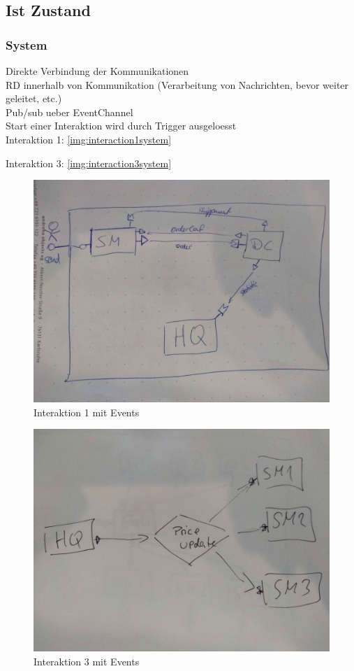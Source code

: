 \subsection{Ist Zustand}
\subsubsection{System}
Direkte Verbindung der Kommunikationen \\
RD innerhalb von Kommunikation (Verarbeitung von Nachrichten, bevor weiter geleitet, etc.)\\
Pub/sub ueber EventChannel \\
Start einer Interaktion wird durch Trigger ausgeloesst \\
Interaktion 1: \autoref{img:interaction1system}

Interaktion 3: \autoref{img:interaction3system}

\begin{figure}
\center
  \includegraphics[width=1\textwidth]{images/evaluation/specjms/interaction1system_events.png}
  \caption{Interaktion 1 mit Events}
  \label{img:interaction1system}
\end{figure}

\begin{figure}
\center
  \includegraphics[width=1\textwidth]{images/evaluation/specjms/interaction3system_events.png}
  \caption{Interaktion 3 mit Events}
  \label{img:interaction3system}
\end{figure}
